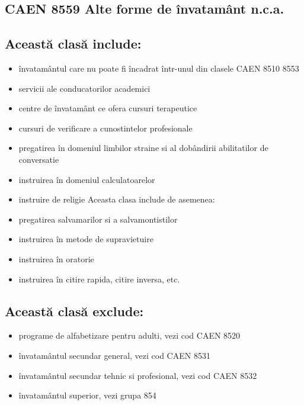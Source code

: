 \documentclass{article}
\begin{document}
\begin{multicols}{3}
\section*{CAEN 8559 Alte forme de învatamânt n.c.a.}
\subsection*{Această clasă include:}
\begin{itemize}
\item învatamântul care nu poate fi încadrat într-unul din clasele CAEN 8510 8553
\item servicii ale conducatorilor academici
\item centre de învatamânt ce ofera cursuri terapeutice
\item cursuri de verificare a cunostintelor profesionale
\item pregatirea în domeniul limbilor straine si al dobândirii abilitatilor de conversatie
\item instruirea în domeniul calculatoarelor
\item instruire de religie
Aceasta clasa include de asemenea:
\item pregatirea salvamarilor si a salvamontistilor
\item instruirea în metode de supravietuire
\item instruirea în oratorie
\item instruirea în citire rapida, citire inversa, etc.
\end{itemize}
\subsection*{Această clasă exclude:}
\begin{itemize}
\item programe de alfabetizare pentru adulti, vezi cod CAEN 8520
\item învatamântul secundar general, vezi cod CAEN 8531
\item învatamântul secundar tehnic si profesional, vezi cod CAEN 8532
\item învatamântul superior, vezi grupa 854
\end{itemize}





\end{multicols}
\end{document}
